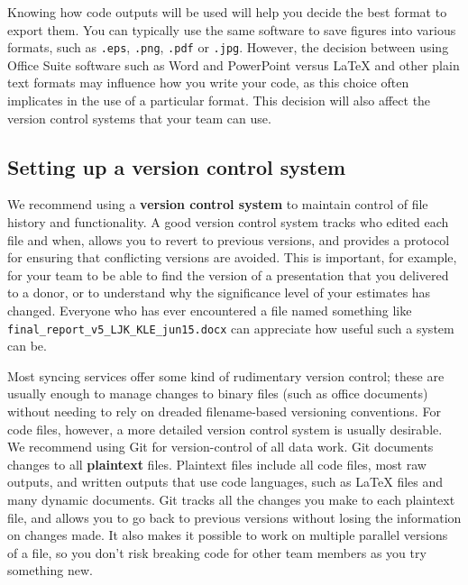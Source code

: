 Knowing how code outputs will be used will help you decide the best format to export them.
You can typically use the same software to save figures into various formats,
such as \texttt{.eps}, \texttt{.png}, \texttt{.pdf} or \texttt{.jpg}.
However, the decision between using Office Suite software
such as Word and PowerPoint versus {\LaTeX} and other plain text formats
may influence how you write your code,
as this choice often implicates in the use of a particular format.
This decision will also affect the version control systems that your team can use.


\subsection{Setting up a version control system}
We recommend using a \textbf{version control system} to
maintain control of file history and functionality.
A good version control system tracks who edited each file and when,
allows you to revert to previous versions,
and provides a protocol for ensuring that conflicting versions are avoided.
This is important, for example, for your team
to be able to find the version of a presentation that you delivered to a donor,
or to understand why the significance level of your estimates has changed.
Everyone who has ever encountered a file named something like \texttt{final\_report\_v5\_LJK\_KLE\_jun15.docx}
can appreciate how useful such a system can be.

Most syncing services offer some kind of rudimentary version control;
these are usually enough to manage changes to binary files (such as office documents)
without needing to rely on dreaded filename-based versioning conventions.
For code files, however, a more detailed version control system is usually desirable.
We recommend using Git for version-control of all data work.
Git documents changes to all \textbf{plaintext} files.
Plaintext files include all code files, most raw outputs,
and written outputs that use code languages,
such as {\LaTeX} files and many dynamic documents.
Git tracks all the changes you make to each plaintext file,
and allows you to go back to previous versions without losing the information on changes made.
It also makes it possible to work on multiple parallel versions of a file,
so you don't risk breaking code for other team members as you try something new.


